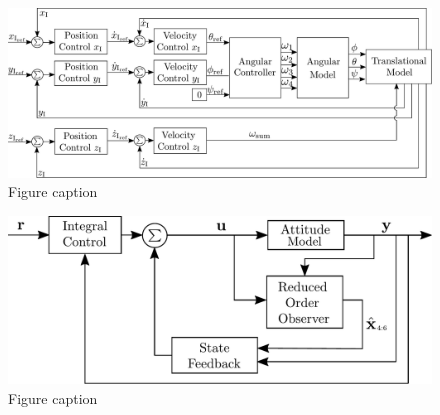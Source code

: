 
\begin{minipage}{\linewidth}
	\begin{minipage}{0.6\linewidth}
		\begin{figure}
			\includegraphics[width=1\linewidth]{figures/TranslationalControlDiagram}
			\caption{Figure caption}
		\end{figure}
	\end{minipage}
	\hspace{0.03\linewidth}
	\begin{minipage}{0.38\linewidth}
		\begin{figure}
			\includegraphics[width=1\linewidth]{figures/AttitudeControlDiagram}
			\caption{Figure caption}
		\end{figure}		
	\end{minipage}
\end{minipage}